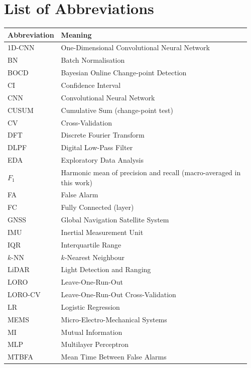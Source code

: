 \section*{List of Abbreviations}

\begin{longtable}{@{}p{0.18\linewidth} p{0.78\linewidth}@{}}
\toprule
\textbf{Abbreviation} & \textbf{Meaning} \\
\midrule
\endhead
1D-CNN      & One-Dimensional Convolutional Neural Network \\
BN          & Batch Normalisation \\
BOCD        & Bayesian Online Change-point Detection \\
CI          & Confidence Interval \\
CNN         & Convolutional Neural Network \\
CUSUM       & Cumulative Sum (change-point test) \\
CV          & Cross-Validation \\
DFT         & Discrete Fourier Transform \\
DLPF        & Digital Low-Pass Filter \\
EDA         & Exploratory Data Analysis \\
$F_1$       & Harmonic mean of precision and recall (macro-averaged in this work) \\
FA          & False Alarm \\
FC          & Fully Connected (layer) \\
GNSS        & Global Navigation Satellite System \\
IMU         & Inertial Measurement Unit \\
IQR         & Interquartile Range \\
$k$-NN      & $k$-Nearest Neighbour \\
LiDAR       & Light Detection and Ranging \\
LORO        & Leave-One-Run-Out \\
LORO-CV     & Leave-One-Run-Out Cross-Validation \\
LR          & Logistic Regression \\
MEMS        & Micro-Electro-Mechanical Systems \\
MI          & Mutual Information \\
MLP         & Multilayer Perceptron \\
MTBFA       & Mean Time Between False Alarms \\

\end{longtable}
